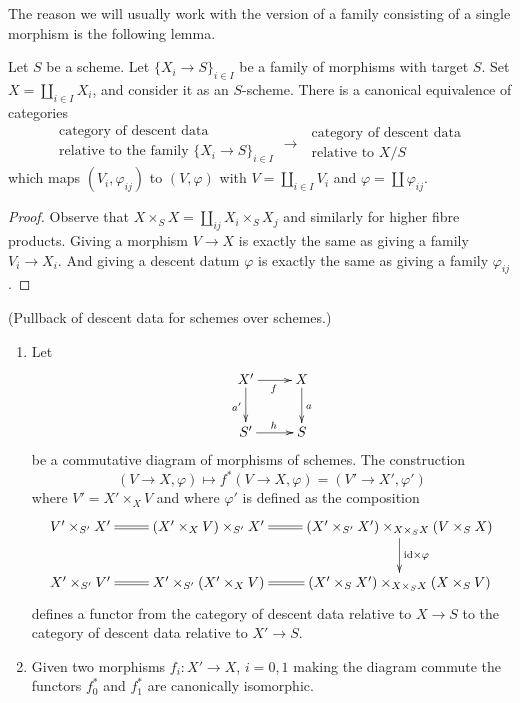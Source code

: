 \noindent
The reason we will usually work with the version of a family consisting
of a single morphism is the following lemma.

\begin{lemma}
\label{lemma-family-is-one}
Let $S$ be a scheme.
Let $\{X_i \to S\}_{i \in I}$ be a family of morphisms with target $S$.
Set $X = \coprod_{i \in I} X_i$, and consider it as an $S$-scheme.
There is a canonical equivalence of categories
$$
\begin{matrix}
\text{category of descent data } \\
\text{relative to the family } \{X_i \to S\}_{i \in I}
\end{matrix}
\longrightarrow
\begin{matrix}
\text{ category of descent data} \\
\text{ relative to } X/S
\end{matrix}
$$
which maps $(V_i, \varphi_{ij})$ to $(V, \varphi)$ with
$V = \coprod_{i\in I} V_i$ and $\varphi = \coprod \varphi_{ij}$.
\end{lemma}

\begin{proof}
Observe that $X \times_S X = \coprod_{ij} X_i \times_S X_j$
and similarly for higher fibre products.
Giving a morphism $V \to X$ is exactly the same as
giving a family $V_i \to X_i$. And giving a descent datum
$\varphi$ is exactly the same as giving a family $\varphi_{ij}$.
\end{proof}

\begin{lemma}
\label{lemma-pullback}
(Pullback of descent data for schemes over schemes.)
\begin{enumerate}
\item Let
$$
\xymatrix{
X' \ar[r]_f \ar[d]_{a'} & X \ar[d]^a \\
S' \ar[r]^h & S
}
$$
be a commutative diagram of morphisms of schemes.
The construction
$$
(V \to X, \varphi) \longmapsto f^*(V \to X, \varphi) = (V' \to X', \varphi')
$$
where $V' = X' \times_X V$ and where
$\varphi'$ is defined as the composition
$$
\xymatrix{
V' \times_{S'} X' \ar@{=}[r] &
(X' \times_X V) \times_{S'} X' \ar@{=}[r] &
(X' \times_{S'} X') \times_{X \times_S X} (V \times_S X)
\ar[d]^{\text{id} \times \varphi} \\
X' \times_{S'} V' \ar@{=}[r] &
X' \times_{S'} (X' \times_X V) &
(X' \times_S X') \times_{X \times_S X} (X \times_S V) \ar@{=}[l]
}
$$
defines a functor from the category of descent data
relative to $X \to S$ to the category of descent data
relative to $X' \to S$.
\item Given two morphisms $f_i : X' \to X$, $i = 0, 1$ making the
diagram commute the functors $f_0^*$ and $f_1^*$ are
canonically isomorphic.
\end{enumerate}
\end{lemma}

